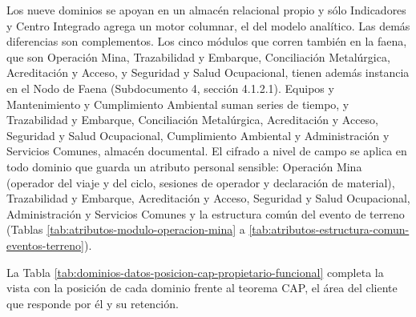 \documentclass[anexo]{../../comun/overfore}
\begin{document}
Los nueve dominios se apoyan en un almacén relacional propio y sólo Indicadores y Centro Integrado agrega un motor columnar, el del modelo analítico. Las demás diferencias son complementos. Los cinco módulos que corren también en la faena, que son Operación Mina, Trazabilidad y Embarque, Conciliación Metalúrgica, Acreditación y Acceso, y Seguridad y Salud Ocupacional, tienen además instancia en el Nodo de Faena (Subdocumento 4, sección 4.1.2.1). Equipos y Mantenimiento y Cumplimiento Ambiental suman series de tiempo, y Trazabilidad y Embarque, Conciliación Metalúrgica, Acreditación y Acceso, Seguridad y Salud Ocupacional, Cumplimiento Ambiental y Administración y Servicios Comunes, almacén documental. El cifrado a nivel de campo se aplica en todo dominio que guarda un atributo personal sensible: Operación Mina (operador del viaje y del ciclo, sesiones de operador y declaración de material), Trazabilidad y Embarque, Acreditación y Acceso, Seguridad y Salud Ocupacional, Administración y Servicios Comunes y la estructura común del evento de terreno (Tablas \ref{tab:atributos-modulo-operacion-mina} a \ref{tab:atributos-estructura-comun-eventos-terreno}).

La Tabla \ref{tab:dominios-datos-posicion-cap-propietario-funcional} completa la vista con la posición de cada dominio frente al teorema CAP, el área del cliente que responde por él y su retención.
\end{document}
